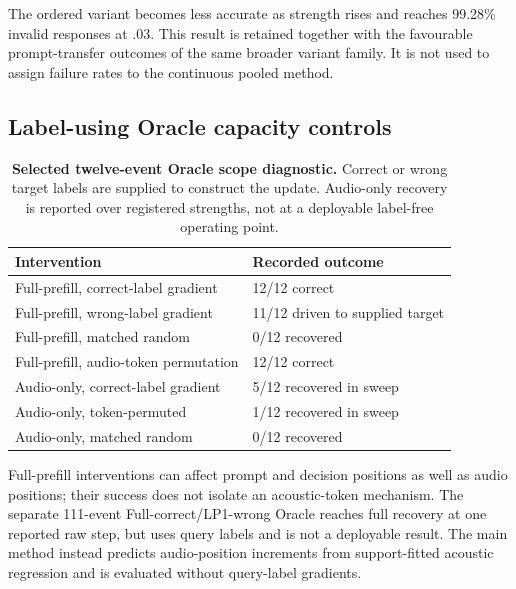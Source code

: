 \documentclass{article}
\begin{document}
The ordered variant becomes less accurate as strength rises and reaches 99.28\% invalid responses at $.03$. This result is retained together with the favourable prompt-transfer outcomes of the same broader variant family. It is not used to assign failure rates to the continuous pooled method.

\subsection{Label-using Oracle capacity controls}
\label{app:oracle}
\begin{table}[htbp]
\caption{\textbf{Selected twelve-event Oracle scope diagnostic.} Correct or wrong target labels are supplied to construct the update. Audio-only recovery is reported over registered strengths, not at a deployable label-free operating point.}
\label{tab:oracle}
\centering\small
\begin{tabular}{@{}L{8.8cm}L{4.0cm}@{}}
\toprule
Intervention & Recorded outcome \\
\midrule
Full-prefill, correct-label gradient & 12/12 correct \\
Full-prefill, wrong-label gradient & 11/12 driven to supplied target \\
Full-prefill, matched random & 0/12 recovered \\
Full-prefill, audio-token permutation & 12/12 correct \\
Audio-only, correct-label gradient & 5/12 recovered in sweep \\
Audio-only, token-permuted & 1/12 recovered in sweep \\
Audio-only, matched random & 0/12 recovered \\
\bottomrule
\end{tabular}
\end{table}

Full-prefill interventions can affect prompt and decision positions as well as audio positions; their success does not isolate an acoustic-token mechanism. The separate 111-event Full-correct/LP1-wrong Oracle reaches full recovery at one reported raw step, but uses query labels and is not a deployable result. The main method instead predicts audio-position increments from support-fitted acoustic regression and is evaluated without query-label gradients.
\end{document}
